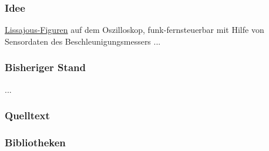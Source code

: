 \subsubsection*{Idee}

\href{https://secure.wikimedia.org/wikipedia/de/wiki/Lissajous-Figuren}
{Lissajous-Figuren} auf dem Oszilloskop, funk-fernsteuerbar mit Hilfe von
Sensordaten des Beschleunigungsmessers ...

\subsubsection*{Bisheriger Stand}
...

\subsubsection*{Quelltext}





\subsubsection*{Bibliotheken}







